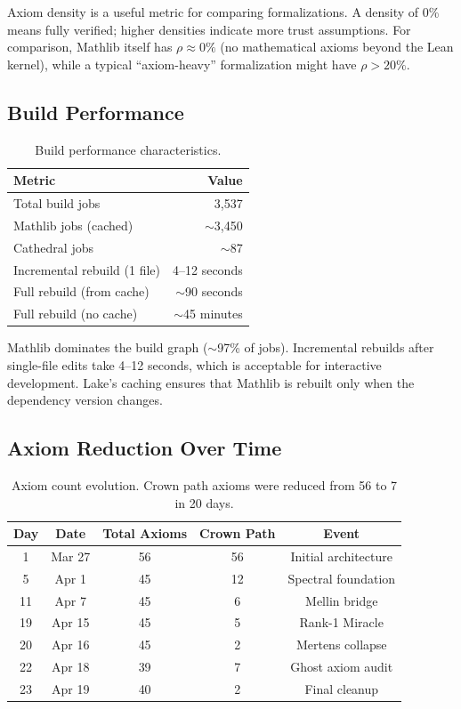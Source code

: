 \documentclass[11pt,a4paper]{article}
\begin{document}
\begin{remark}
Axiom density is a useful metric for comparing formalizations. A
density of 0\% means fully verified; higher densities indicate more
trust assumptions. For comparison, Mathlib itself has $\rho \approx 0\%$
(no mathematical axioms beyond the Lean kernel), while a typical
``axiom-heavy'' formalization might have $\rho > 20\%$.
\end{remark}

\subsection{Build Performance}

\begin{table}[h]
\centering
\begin{tabular}{@{}lr@{}}
\toprule
\textbf{Metric} & \textbf{Value} \\
\midrule
Total build jobs & 3,537 \\
Mathlib jobs (cached) & $\sim$3,450 \\
Cathedral jobs & $\sim$87 \\
Incremental rebuild (1 file) & 4--12 seconds \\
Full rebuild (from cache) & $\sim$90 seconds \\
Full rebuild (no cache) & $\sim$45 minutes \\
\bottomrule
\end{tabular}
\caption{Build performance characteristics.}
\label{tab:build}
\end{table}

Mathlib dominates the build graph ($\sim$97\% of jobs). Incremental
rebuilds after single-file edits take 4--12 seconds, which is
acceptable for interactive development. Lake's caching ensures that
Mathlib is rebuilt only when the dependency version changes.

\subsection{Axiom Reduction Over Time}

\begin{table}[h]
\centering
\begin{tabular}{@{}ccccc@{}}
\toprule
\textbf{Day} & \textbf{Date} & \textbf{Total Axioms} & \textbf{Crown Path} & \textbf{Event} \\
\midrule
1 & Mar 27 & 56 & 56 & Initial architecture \\
5 & Apr 1 & 45 & 12 & Spectral foundation \\
11 & Apr 7 & 45 & 6 & Mellin bridge \\
19 & Apr 15 & 45 & 5 & Rank-1 Miracle \\
20 & Apr 16 & 45 & 2 & Mertens collapse \\
22 & Apr 18 & 39 & 7 & Ghost axiom audit \\
23 & Apr 19 & 40 & 2 & Final cleanup \\
\bottomrule
\end{tabular}
\caption{Axiom count evolution. Crown path axioms were reduced
from 56 to 7 in 20 days.}
\label{tab:axiom-history}
\end{table}
\end{document}
